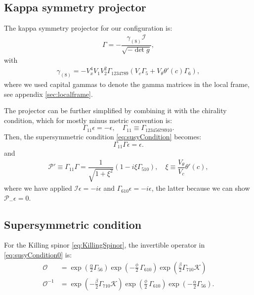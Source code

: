 \subsection{Kappa symmetry projector}

The kappa symmetry projector for our configuration is:
\begin{align}
\Gamma = - \dfrac{ \gamma_{(8)} \mathcal{I} }{\sqrt{-\det g}},
\end{align}
with
\begin{align}
 \gamma_{(8)} = - V_x^4 V_1 V_2^2 \Gamma_{1 2 3 4 7 8 9}( V_c \Gamma_5 +  V_{\theta} \theta'(c) \Gamma_6), 
\end{align}
where we used capital gammas to denote the gamma matrices in the local frame, see appendix \ref{sec:localframe}.

The projector can be further simplified by combining it with the chirality condition, which for mostly minus metric convention is: 
\begin{equation}
 \Gamma_{11} \epsilon = -\epsilon, \quad 
 \Gamma_{11} \equiv \Gamma_{12345678910}.
\end{equation}
Then, the supersymmetric condition \eqref{eq:susyCondition} becomes:
\begin{equation}
 \Gamma_{11} \Gamma \epsilon = \epsilon.
\end{equation}
and 
\begin{align} \label{eq:newProjector}
  \mathcal{P}' \equiv \Gamma_{11} \Gamma  = \dfrac{1}{\sqrt{1+\xi^2}}(1- i \xi  \Gamma_{510}), \quad 
   \xi \equiv  \dfrac{V_\theta}{V_c} \theta'(c),
\end{align}
where we have applied $\mathcal{I} \epsilon = -i\epsilon$ and $\Gamma_{610} \epsilon = -i \epsilon$, the latter because we can show $\mathcal{P}_- \epsilon =0$. 


\subsection{Supersymmetric condition}

For the Killing spinor \eqref{eq:KillingSpinor}, the invertible operator in \eqref{eq:susyCondition0} is:
\begin{align}
 \mathcal{O} &= \exp{\left(\frac{\alpha}{2}\Gamma_{56} \right)} \exp{\left(-\frac{\phi}{2}\, \Gamma_{610} \right)} \exp{\left(\frac{\beta}{2}\Gamma_{710} \mathcal{K} \right)} \\
 \mathcal{O}^{-1} &=  \exp{\left(-\frac{\beta}{2}\Gamma_{710} \mathcal{K} \right)} 
 \exp{\left(\frac{\phi}{2}\, \Gamma_{610} \right)} 
 \exp{\left(-\frac{\alpha}{2}\Gamma_{56} \right)}.
\end{align}


